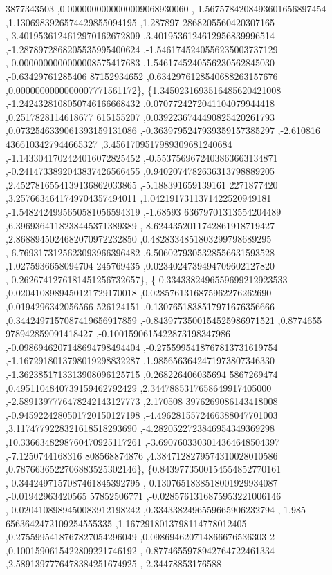 \begin{DoxyCode}
      3877343503 ,0.0000000000000009068930060 ,-1.5675784208493601656897454 ,1.1306983926574429855094195 ,1.287897
      2868205560420307165 ,-3.4019536124612970162672809 ,3.4019536124612956839996514 ,-1.2878972868205535995400624
       ,-1.5461745240556235003737129 ,-0.0000000000000008575417683 ,1.5461745240556230562845030 ,-0.63429761285406
      87152934652 ,0.6342976128540688263157676 ,0.0000000000000007771561172\},
\{1.3450231693516485620421008 ,-1.2424328108050746166668432 ,0.0707724272041104079944418 ,0.2517828114618677
      615155207 ,0.0392236744490825420261793 ,0.0732546339061393159131086 ,-0.3639795247939359157385297 ,-2.610816
      4366103427944665327 ,3.4561709517989309681240684 ,-1.1433041702424016072825452 ,-0.5537569672403863663134871
       ,-0.2414733892043837426566455 ,0.9402074782636313798889205 ,2.4527816554139136862033865 ,-5.188391659139161
      2271877420 ,3.2576634641749704357494011 ,1.0421917311371422520949181 ,-1.5482424995650581056594319 ,-1.68593
      63679701313554204489 ,6.3969364118238445371389389 ,-8.6244352011742861918719427 ,2.8688945024682070972232850
       ,0.4828334851803299798689295 ,-6.7693173125623093966396482 ,6.5060279305328556631593528 ,1.0275936658094704
      245769435 ,0.0234024739494709602127820 ,-0.2626741276181451256732657\},
\{-0.3343382496559699212923533 ,0.0204108989450121729170018 ,0.0285761316875962276262690 ,0.0194296342056566
      526124151 ,0.1307651838517971676356666 ,0.3442497157087419656917859 ,-0.8439773500154525986971521 ,0.8774655
      978942859091418427 ,-0.1001590615422873198347986 ,-0.0986946207148694798494404 ,-0.2755995418767813731619754
       ,-1.1672918013798019298832287 ,1.9856563642471973807346330 ,-1.3623851713313908096125715 ,0.268226406035694
      5867269474 ,0.4951104840739159462792429 ,2.3447885317658649917405000 ,-2.5891397776478242143127773 ,2.170508
      3976269086143418008 ,-0.9459224280501720150127198 ,-4.4962815572466388047701003 ,3.1174779228321618518293690
       ,-4.2820522723846954349369298 ,10.3366348298760470925117261 ,-3.6907603303014364648504397 ,-7.1250744168316
      808568874876 ,4.3847128279574310028010586 ,0.7876636522706883525302146\},
\{0.8439773500154554852770161 ,-0.3442497157087461845392795 ,-0.1307651838518001929934087 ,-0.01942963420565
      57852506771 ,-0.0285761316875953221006146 ,-0.0204108989450083912198242 ,0.3343382496559665906232794 ,-1.985
      6563642472109254555335 ,1.1672918013798114778012405 ,0.2755995418767827054296049 ,0.098694620714866676536303
      2 ,0.1001590615422809221746192 ,-0.8774655978942764722461334 ,2.5891397776478384251674925 ,-2.34478853176588

\end{DoxyCode}

